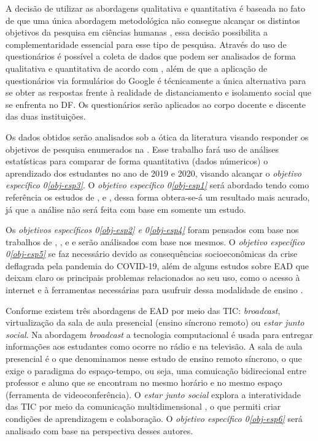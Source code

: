 \documentclass[
	arial,
	12pt,				%
	openright,			%
	oneside,
	a4paper,			%
	chapter=TITLE,		%
	english,			%
	french,				%
	spanish,			%
	brazil,				%
	]{abntex2}
\begin{document}
A decisão de utilizar as abordagens qualitativa e quantitativa é baseada no fato de que uma única abordagem metodológica não consegue alcançar os distintos objetivos da pesquisa em ciências humanas \cite{santos}, essa decisão possibilita a complementaridade essencial para esse tipo de pesquisa. Através do uso de questionários é possível a coleta de dados que podem ser analisados de forma qualitativa e quantitativa de acordo com , além de que a aplicação de questionários via formulários do Google é técnicamente a única alternativa para se obter as respostas frente à realidade de distanciamento e isolamento social que se enfrenta no DF. Os questionários serão aplicados ao corpo docente e discente das duas instituições.  

Os dados obtidos serão analisados sob a ótica da literatura visando responder os  objetivos de pesquisa enumerados na . Esse trabalho fará uso de análises estatísticas para comparar de forma quantitativa (dados númericos) o aprendizado dos estudantes no ano de 2019 e 2020, visando alcançar o \textit{objetivo específico 0\ref{obj-esp3}}. O \textit{objetivo específico 0\ref{obj-esp1}} será abordado tendo como referência os estudos de ,  e , dessa forma obtera-se-á um resultado mais acurado, já que a análise não será feita com base em somente um estudo. 

Os \textit{objetivos específicos 0\ref{obj-esp2} e 0\ref{obj-esp4}} foram pensados com base nos trabalhos de , ,  e  e serão análisados com base nos mesmos. O \textit{objetivo específico 0\ref{obj-esp5}} se faz necessário devido as consequências socioeconômicas da crise deflagrada pela pandemia do COVID-19, além de alguns estudos sobre EAD que deixam claro os principais problemas relacionados ao seu uso, como o acesso à internet e à ferramentas necessárias para usufruir dessa modalidade de ensino \cite{benakouche2000educaccao, arieira2009avaliaccao}.

Conforme  existem três abordagens de EAD por meio das TIC: \textit{broadcast}, virtualização da sala de aula presencial (ensino síncrono remoto) ou \textit{estar junto social}. Na abordagem \textit{broadcast} a tecnologia computacional é usada para entregar informações aos estudantes como ocorre no rádio e na televisão. A sala de aula presencial é o que denominamos nesse estudo de ensino remoto síncrono, o que exige o paradigma do espaço-tempo, ou seja, uma comuicação bidirecional entre professor e aluno que se encontram no mesmo horário e no mesmo espaço (ferramenta de videoconferência). O \textit{estar junto social} explora a interatividade das TIC por meio da comunicação multidimensional \cite{almeida2003educaccao}, o que permiti criar condições de aprendizagem e colaboração. O \textit{objetivo específico 0\ref{obj-esp6}} será analisado com base na perspectiva desses autores.
\end{document}
